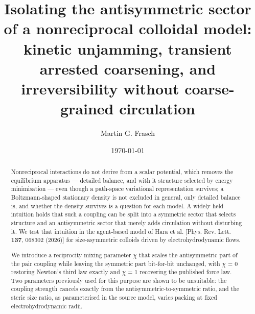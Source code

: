 \documentclass[aps,pre,preprint,superscriptaddress,nofootinbib,longbibliography]{revtex4-2}
\begin{document}
\title{Isolating the antisymmetric sector of a nonreciprocal colloidal model:
kinetic unjamming, transient arrested coarsening, and irreversibility
without coarse-grained circulation}

\author{Martin G. Frasch}

\date{\today}

\begin{abstract}
Nonreciprocal interactions do not derive from a scalar potential, which removes the equilibrium apparatus --- detailed balance, and with it structure selected by energy minimisation --- even though a path-space variational representation survives; a Boltzmann-shaped stationary density is not excluded in general, only detailed balance is, and whether the density survives is a question for each model. A widely held intuition holds that such a coupling can be split into a symmetric sector that selects structure and an antisymmetric sector that merely adds circulation without disturbing it. We test that intuition in the agent-based model of Hara et al. [Phys. Rev. Lett. \textbf{137}, 068302 (2026)] for size-asymmetric colloids driven by electrohydrodynamic flows.

We introduce a reciprocity mixing parameter $\chi$ that scales the antisymmetric part of the pair coupling while leaving the symmetric part bit-for-bit unchanged, with $\chi$ = 0 restoring Newton's third law exactly and $\chi$ = 1 recovering the published force law. Two parameters previously used for this purpose are shown to be unsuitable: the coupling strength cancels exactly from the antisymmetric-to-symmetric ratio, and the steric size ratio, as parameterised in the source model, varies packing at fixed electrohydrodynamic radii.


\end{abstract}
\end{document}
